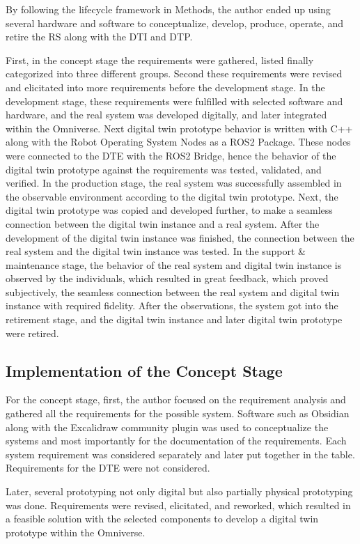 \documentclass[conference]{IEEEtran}
\begin{document}
    By following the lifecycle framework in Methods, the author ended up using several hardware and software to conceptualize, develop, produce, operate, and retire the RS along with the DTI and DTP.

    First, in the concept stage the requirements were gathered, listed finally categorized into three different groups. Second these requirements were revised and elicitated into more requirements before the development stage. 
    In the development stage, these requirements were fulfilled with selected software and hardware, and the real system was developed digitally, and later integrated within the Omniverse. Next digital twin prototype behavior is written with C++ along with the Robot Operating System Nodes as a ROS2 Package. These nodes were connected to the DTE with the ROS2 Bridge, hence the behavior of the digital twin prototype against the requirements was tested, validated, and verified. 
    In the production stage, the real system was successfully assembled in the observable environment according to the digital twin prototype. Next, the digital twin prototype was copied and developed further,  to make a seamless connection between the digital twin instance and a real system. After the development of the digital twin instance was finished, the connection between the real system and the digital twin instance was tested. 
    In the support \& maintenance stage, the behavior of the real system and digital twin instance is observed by the individuals, which resulted in great feedback, which proved subjectively, the seamless connection between the real system and digital twin instance with required fidelity. 
    After the observations, the system got into the retirement stage, and the digital twin instance and later digital twin prototype were retired.

    \subsection{Implementation of the Concept Stage}
    For the concept stage, first, the author focused on the requirement analysis and gathered all the requirements for the possible system. Software such as Obsidian along with the Excalidraw community plugin was used to conceptualize the systems and most importantly 
    for the documentation of the requirements. Each system requirement was considered separately and later put together in the table. Requirements for the DTE were not considered.    

    Later, several prototyping not only digital but also partially physical prototyping was done. 
    Requirements were revised, elicitated, and reworked, which resulted in a feasible solution with the selected components to develop a digital twin prototype within the Omniverse.
    
\end{document}
